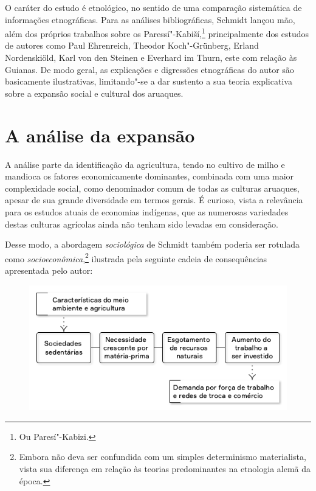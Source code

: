 O caráter do estudo é etnológico, no sentido de uma comparação sistemática de informações etnográficas. Para as análises bibliográficas, Schmidt lançou mão, além dos próprios trabalhos sobre os Paressí"-Kabiší,\footnote{Ou Paresí"-Kabizi.} principalmente dos estudos de autores como Paul Ehrenreich, Theodor Koch"-Grünberg, Erland Nordenskiöld, Karl von den Steinen e Everhard im Thurn, este com relação às Guianas. De modo geral, as explicações e digressões etnográficas do autor são basicamente ilustrativas, limitando"-se a dar sustento a sua teoria explicativa sobre a expansão social e cultural dos aruaques.

\section{A análise da expansão}

A análise parte da identificação da agricultura, tendo no cultivo de milho e mandioca os fatores economicamente dominantes, combinada com uma maior complexidade social, como denominador comum de todas as culturas aruaques, apesar de sua grande diversidade em termos gerais. É curioso, vista a relevância para os estudos atuais de economias indígenas, que as numerosas variedades destas culturas agrícolas ainda não tenham sido levadas em consideração.

Desse modo, a abordagem \textit{sociológica} de Schmidt também poderia ser
rotulada como \textit{socioeconômica},\footnote{Embora não deva ser confundida com um
simples determinismo materialista, vista sua diferença em relação às teorias
predominantes na etnologia alemã da época.} ilustrada pela seguinte cadeia de 
consequências apresentada pelo autor:

\begin{figure}[H]
  \includegraphics[width=\textwidth]{./TABELA.png}  
\end{figure}

